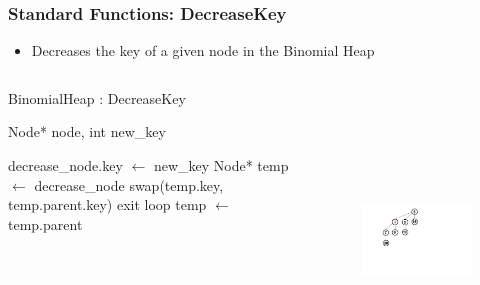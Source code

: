 \documentclass[13pt]{beamer}
\begin{document}
\begin{frame}
\frametitle{Standard Functions: DecreaseKey}
  \begin{itemize}
    \item Decreases the key of a given node in the Binomial Heap
  \end{itemize}

  \begin{columns}[T] %
    \begin{column}[T]{6cm} %
        \begin{algorithm}[H]
        \small
        \caption{BinomialHeap : DecreaseKey}
        \begin{algorithmic}
          \REQUIRE Node* node, int new\_key

          \STATE decrease\_node.key $\leftarrow$ new\_key
          \STATE Node* temp $\leftarrow$ decrease\_node
                \STATE swap(temp.key, temp.parent.key)
              \ELSE
                \STATE exit loop
              \ENDIF
              \STATE temp $\leftarrow$ temp.parent
          \ENDWHILE
        \end{algorithmic}
        \end{algorithm}
    \end{column}
    \begin{column}[T]{7.5cm} %
      \begin{figure}
        \includegraphics[height=8cm]{./img/decreasekeyC.png}
      \end{figure}
    \end{column}
  \end{columns}

\end{frame}
\end{document}
